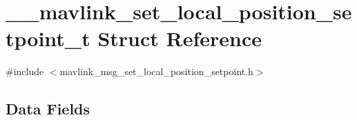 \hypertarget{struct____mavlink__set__local__position__setpoint__t}{\section{\-\_\-\-\_\-mavlink\-\_\-set\-\_\-local\-\_\-position\-\_\-setpoint\-\_\-t Struct Reference}
\label{struct____mavlink__set__local__position__setpoint__t}
}


{\ttfamily \#include $<$mavlink\-\_\-msg\-\_\-set\-\_\-local\-\_\-position\-\_\-setpoint.\-h$>$}

\subsection*{Data Fields}
